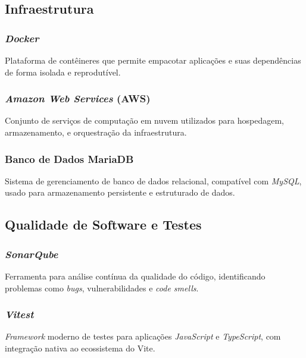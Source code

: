 \subsection{Infraestrutura} 

\subsubsection{\emph{Docker}}
Plataforma de contêineres que permite empacotar aplicações e suas dependências de forma isolada e reprodutível.

\subsubsection{\emph{Amazon Web Services} (AWS)} 
Conjunto de serviços de computação em nuvem utilizados para hospedagem, armazenamento, e orquestração da infraestrutura.

\subsubsection{Banco de Dados MariaDB}
Sistema de gerenciamento de banco de dados relacional, compatível com \emph{MySQL}, usado para armazenamento persistente e estruturado de dados.

\subsection{Qualidade de Software e Testes} 

\subsubsection{\emph{SonarQube}} 
Ferramenta para análise contínua da qualidade do código, identificando problemas como \emph{bugs}, vulnerabilidades e \emph{code smells}.

\subsubsection{\emph{Vitest}}
\emph{Framework} moderno de testes para aplicações \emph{JavaScript} e \emph{TypeScript}, com integração nativa ao ecossistema do Vite.

